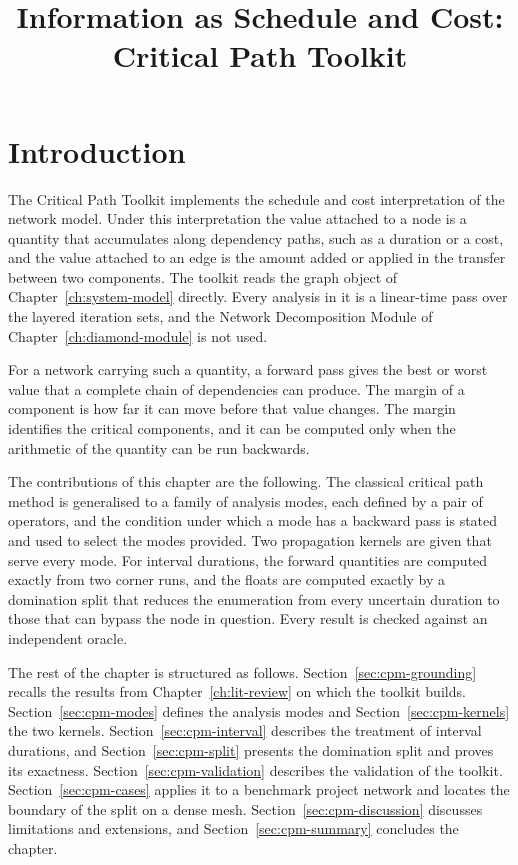 \documentclass[12pt]{report}
\begin{document}
\title{Information as Schedule and Cost: Critical Path Toolkit}
\fi

\newcommand{\comb}{\oplus}
\newcommand{\prop}{\otimes}
\providecommand{\PH}[1]{\textbf{[#1]}}

\section{Introduction}
\label{sec:cpm-intro}

The Critical Path Toolkit implements the schedule and cost interpretation of the network
model. Under this interpretation the value attached to a node is a quantity that accumulates
along dependency paths, such as a duration or a cost, and the value attached to an edge is the amount added or applied in the transfer
between two components. The toolkit reads the graph object of
Chapter~\ref{ch:system-model} directly. Every analysis in it is a linear-time pass over the
layered iteration sets, and the Network Decomposition Module of
Chapter~\ref{ch:diamond-module} is not used.

For a network carrying such a quantity, a forward pass gives the best or worst value that a
complete chain of dependencies can produce. The margin of a component is how far it can
move before that value changes. The margin identifies the critical components, and it can be computed only when the arithmetic of
the quantity can be run backwards.

The contributions of this chapter are the following. The classical critical path method is
generalised to a family of analysis modes, each defined by a pair of operators, and the
condition under which a mode has a backward pass is stated and used to select the modes
provided. Two propagation kernels are given that serve every mode. For interval durations,
the forward quantities are computed exactly from two corner runs, and the floats are
computed exactly by a domination split that reduces the enumeration from every uncertain
duration to those that can bypass the node in question. Every result is checked against an
independent oracle.

The rest of the chapter is structured as follows. Section~\ref{sec:cpm-grounding} recalls
the results from Chapter~\ref{ch:lit-review} on which the toolkit builds.
Section~\ref{sec:cpm-modes} defines the analysis modes and Section~\ref{sec:cpm-kernels}
the two kernels. Section~\ref{sec:cpm-interval} describes the treatment of interval
durations, and Section~\ref{sec:cpm-split} presents the domination split and proves its
exactness. Section~\ref{sec:cpm-validation} describes the validation of the toolkit.
Section~\ref{sec:cpm-cases} applies it to a benchmark project network and locates the
boundary of the split on a dense mesh.
Section~\ref{sec:cpm-discussion} discusses limitations and extensions, and
Section~\ref{sec:cpm-summary} concludes the chapter.
\end{document}
